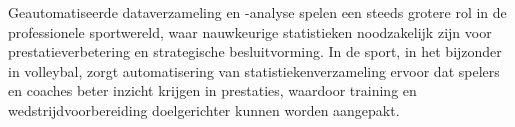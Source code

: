 



Geautomatiseerde dataverzameling en -analyse spelen een steeds grotere rol in de professionele sportwereld, waar nauwkeurige statistieken noodzakelijk zijn voor prestatieverbetering en strategische besluitvorming. In de sport, in het bijzonder in volleybal, zorgt automatisering van statistiekenverzameling ervoor dat spelers en coaches beter inzicht krijgen in prestaties, waardoor training en wedstrijdvoorbereiding doelgerichter kunnen worden aangepakt.

